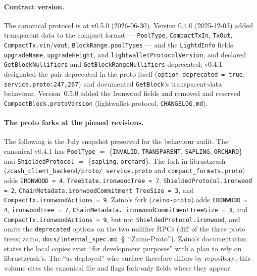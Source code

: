 \documentclass[11pt,a4paper]{article}
\theoremstyle{definition}
\begin{document}
\paragraph{Contract version.} The canonical protocol is at v0.5.0
(2026-06-30). Version 0.4.0 (2025-12-03) added transparent data to the
compact format --- \texttt{PoolType}, \texttt{CompactTxIn}, \texttt{TxOut},
\texttt{CompactTx.vin}/\texttt{vout}, \texttt{BlockRange.poolTypes} --- and
the \texttt{LightdInfo} fields \texttt{upgradeName},
\texttt{upgradeHeight}, and \texttt{lightwalletProtocolVersion}, and
declared \texttt{GetBlockNullifiers} and
\texttt{GetBlockRangeNullifiers} deprecated; v0.4.1 designated the pair
deprecated in the proto itself (\texttt{option deprecated = true},
\texttt{service.proto:247,267}) and documented \texttt{GetBlock}'s
transparent-data behaviour. Version~0.5.0 added the Ironwood fields and
removed and reserved \texttt{CompactBlock.protoVersion}
(\textsf{lightwallet-protocol}, \texttt{CHANGELOG.md}).

\paragraph{The proto forks at the pinned revisions.} The following is the
July snapshot preserved for the behaviour audit. The canonical v0.4.1 has
\texttt{PoolType} $=$ \{\texttt{INVALID},
\texttt{TRANSPARENT}, \texttt{SAPLING}, \texttt{ORCHARD}\} and
\texttt{Shielded\allowbreak Protocol} $=$
\{\texttt{sapling}, \texttt{orchard}\}.
The fork in \textsf{librustzcash}
(\texttt{zcash\_client\_\allowbreak backend/\allowbreak proto/\allowbreak
service.proto} and \texttt{compact\_\allowbreak formats.proto}) adds
\texttt{IRONWOOD = 4},
\texttt{TreeState.\allowbreak ironwoodTree = 7},
\texttt{ShieldedProtocol.\allowbreak ironwood = 2},
\texttt{ChainMetadata.\allowbreak ironwood\allowbreak Commitment\allowbreak
TreeSize = 3}, and
\texttt{CompactTx.ironwoodActions = 9}. Zaino's fork
(\texttt{zaino-proto}) adds \texttt{IRONWOOD = 4},
\texttt{ironwoodTree = 7}, \texttt{ChainMetadata.\allowbreak
ironwood\allowbreak CommitmentTreeSize = 3}, and
\texttt{CompactTx.\allowbreak ironwoodActions = 9}, but not
\texttt{Shielded\allowbreak Protocol.\allowbreak ironwood}, and omits the
\texttt{deprecated} options on the two nullifier RPCs (diff of the three
proto trees; \textsf{zaino},
\texttt{docs/\allowbreak internal\_\allowbreak spec.md},
\S~``Zaino-Proto''). Zaino's documentation states the local copies exist
``for development purposes'' with a plan to rely on librustzcash's. The
``as deployed'' wire surface therefore differs by repository; this volume
cites the canonical file and flags fork-only fields where they appear.
\end{document}
